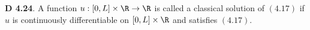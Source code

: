 {\bf D 4.24}. A function $u:[0,L]\times\R\rightarrow\R$ is called a classical solution of $(4.17)$ if $u$ is continuously differentiable on $[0,L]\times\R$ and satisfies $(4.17)$.